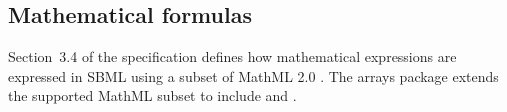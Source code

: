 \subsection{Mathematical formulas}
\label{math-formulas}
Section~3.4 of the \sbmlthreecore specification defines how mathematical expressions are expressed in SBML using a subset of MathML 2.0 \citep{w3c:2000b}.   
The arrays package extends the supported MathML subset to include  and .
